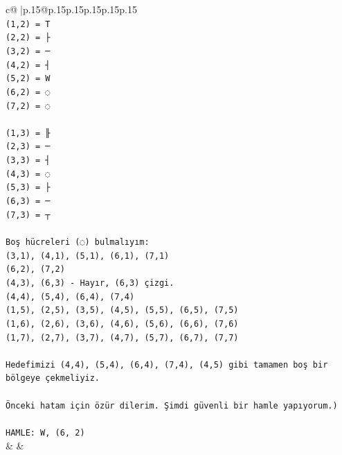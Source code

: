 \documentclass{article}
\begin{document}
{\begin{supertabular}{c@{$\;$}|p{.15\linewidth}@{}p{.15\linewidth}p{.15\linewidth}p{.15\linewidth}p{.15\linewidth}p{.15\linewidth}}
{{{\\ 
\texttt{(1,2) = T} \\
\texttt{(2,2) = ├} \\
\texttt{(3,2) = ─} \\
\texttt{(4,2) = ┤} \\
\texttt{(5,2) = W} \\
\texttt{(6,2) = ◌} \\
\texttt{(7,2) = ◌} \\
\\ 
\texttt{(1,3) = ╟} \\
\texttt{(2,3) = ─} \\
\texttt{(3,3) = ┤} \\
\texttt{(4,3) = ◌} \\
\texttt{(5,3) = ├} \\
\texttt{(6,3) = ─} \\
\texttt{(7,3) = ┬} \\
\\ 
\texttt{Boş hücreleri (◌) bulmalıyım:} \\
\texttt{(3,1), (4,1), (5,1), (6,1), (7,1)} \\
\texttt{(6,2), (7,2)} \\
\texttt{(4,3), (6,3) {-} Hayır, (6,3) çizgi.} \\
\texttt{(4,4), (5,4), (6,4), (7,4)} \\
\texttt{(1,5), (2,5), (3,5), (4,5), (5,5), (6,5), (7,5)} \\
\texttt{(1,6), (2,6), (3,6), (4,6), (5,6), (6,6), (7,6)} \\
\texttt{(1,7), (2,7), (3,7), (4,7), (5,7), (6,7), (7,7)} \\
\\ 
\texttt{Hedefimizi (4,4), (5,4), (6,4), (7,4), (4,5) gibi tamamen boş bir bölgeye çekmeliyiz.} \\
\\ 
\texttt{Önceki hatam için özür dilerim. Şimdi güvenli bir hamle yapıyorum.)} \\
\\ 
\texttt{HAMLE: W, (6, 2)} \\
            }
        }
    }
    & & \\ \\


\end{supertabular}}
\end{document}
